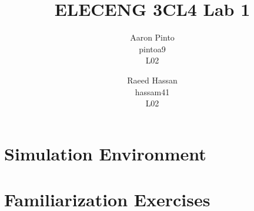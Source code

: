 \documentclass[12pt]{article}
\title{ELECENG 3CL4 Lab 1}
\author{
    Aaron Pinto \\
    pintoa9 \\
    L02
    \and
    Raeed Hassan \\
    hassam41 \\
    L02
}
\begin{document}
\maketitle
\clearpage

\section*{Simulation Environment}
\section*{Familiarization Exercises} %
\end{document}
